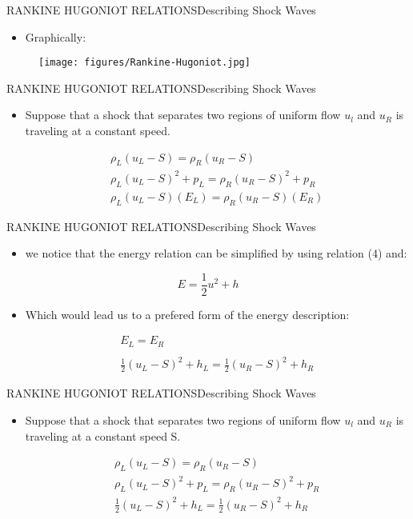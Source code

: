 \documentclass{beamer}
\begin{document}
\begin{frame}{RANKINE HUGONIOT RELATIONS}{Describing Shock Waves}
  \begin{itemize}
   \item Graphically:
  \end{itemize}
  \begin{figure}
   \texttt{[image: figures/Rankine-Hugoniot.jpg]}
  \end{figure}
\end{frame}

\begin{frame}{RANKINE HUGONIOT RELATIONS}{Describing Shock Waves}
  \begin{itemize}
   \item Suppose that a shock that separates two regions of uniform flow $u_l$ and $u_R$ is traveling at a constant speed.
  \end{itemize}
  \begin{eqnarray}
    &&\rho_L(u_L-S)=\rho_R(u_R-S) \\
    &&\rho_L(u_L-S)^2+p_L=\rho_R(u_R-S)^2+p_R \\
    &&\rho_L(u_L-S)(E_L)=\rho_R(u_R-S)(E_R) \nonumber
  \end{eqnarray}
\end{frame}

\begin{frame}{RANKINE HUGONIOT RELATIONS}{Describing Shock Waves}
  \begin{itemize}
   \item we notice that the energy relation can be simplified by using relation \alert{(4)} and:
  \end{itemize}
  \begin{equation}
    E=\frac{1}{2}u^2+h \nonumber
  \end{equation}
  \begin{itemize}
   \item Which would lead us to a prefered form of the energy description:
  \end{itemize}
  \begin{eqnarray}
    &&E_L=E_R \nonumber \\
    && \nonumber \\
    &&\frac{1}{2}(u_L-S)^2+h_L=\frac{1}{2}(u_R-S)^2+h_R \nonumber
  \end{eqnarray}
\end{frame}

\begin{frame}{RANKINE HUGONIOT RELATIONS}{Describing Shock Waves}
  \begin{itemize}
   \item Suppose that a shock that separates two regions of uniform flow $u_l$ and $u_R$ is traveling at a constant speed S.
  \end{itemize}
  \begin{eqnarray}
    &&\rho_L(u_L-S)=\rho_R(u_R-S) \nonumber \\
    &&\rho_L(u_L-S)^2+p_L=\rho_R(u_R-S)^2+p_R \nonumber \\
    &&\frac{1}{2}(u_L-S)^2+h_L=\frac{1}{2}(u_R-S)^2+h_R 
  \end{eqnarray}
\end{frame}
\end{document}
